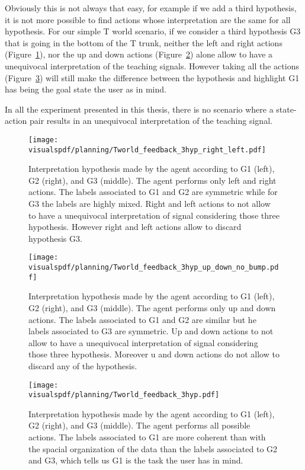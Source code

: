 Obviously this is not always that easy, for example if we add a third hypothesis, it is not more possible to find actions whose interpretation are the same for all hypothesis. For our simple T world scenario, if we consider a third hypothesis G3 that is going in the bottom of the T trunk, neither the left and right actions (Figure~\ref{fig:planning3hyprightleft}), nor the up and down actions (Figure~\ref{fig:planning3hypupdown}) alone allow to have a unequivocal interpretation of the teaching signals. However taking all the actions (Figure~\ref{fig:planning3hyp}) will still make the difference between the hypothesis and highlight G1 has being the goal state the user as in mind.

In all the experiment presented in this thesis, there is no scenario where a state-action pair results in an unequivocal interpretation of the teaching signal. 

\begin{figure}[!ht]
  \centering
  \texttt{[image: \\visualspdf/planning/Tworld\_feedback\_3hyp\_right\_left.pdf]}
  \caption{Interpretation hypothesis made by the agent according to G1 (left), G2 (right), and G3 (middle). The agent performs only left and right actions. The labels associated to G1 and G2 are symmetric while for G3 the labels are highly mixed. Right and left actions to not allow to have a unequivocal interpretation of signal considering those three hypothesis. However right and left actions allow to discard hypothesis G3.}
  \label{fig:planning3hyprightleft}
\end{figure}

\begin{figure}[!ht]
  \centering
  \texttt{[image: \\visualspdf/planning/Tworld\_feedback\_3hyp\_up\_down\_no\_bump.pdf]}
  \caption{Interpretation hypothesis made by the agent according to G1 (left), G2 (right), and G3 (middle). The agent performs only up and down actions. The labels associated to G1 and G2 are similar but he labels associated to G3 are symmetric. Up and down actions to not allow to have a unequivocal interpretation of signal considering those three hypothesis. Moreover u and down actions do not allow to discard any of the hypothesis.}
  \label{fig:planning3hypupdown}
\end{figure}

\begin{figure}[H]
  \centering
  \texttt{[image: \\visualspdf/planning/Tworld\_feedback\_3hyp.pdf]}
  \caption{Interpretation hypothesis made by the agent according to G1 (left), G2 (right), and G3 (middle). The agent performs all possible actions. The labels associated to G1 are more coherent than with the spacial organization of the data than the labels associated to G2 and G3, which tells us G1 is the task the user has in mind.}
  \label{fig:planning3hyp}
\end{figure}

